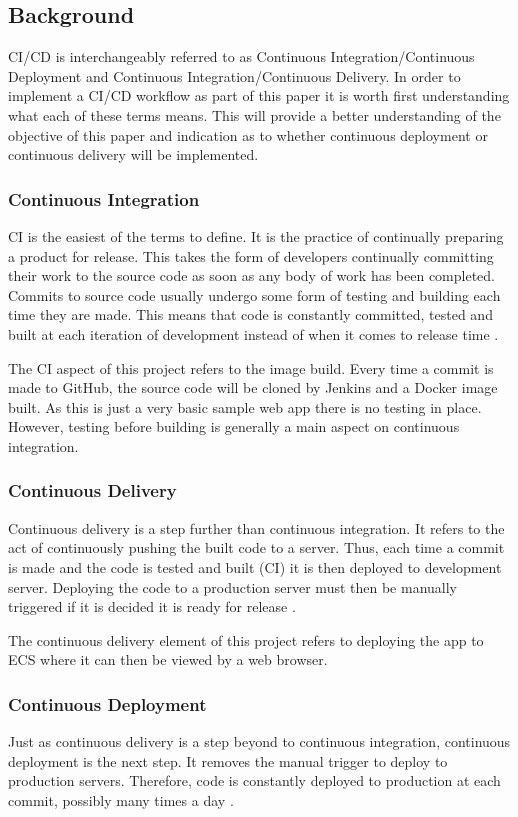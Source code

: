 	\subsection{Background}
	CI/CD is interchangeably referred to as Continuous Integration/Continuous Deployment and Continuous Integration/Continuous Delivery. In order to implement a CI/CD workflow as part of this paper it is worth first understanding what each of these terms means. This will provide a better understanding of the objective of this paper and indication as to whether continuous deployment or continuous delivery will be implemented.
	
	\subsubsection{Continuous Integration} CI is the easiest of the terms to define. It is the practice of continually preparing a product for release. This takes the form of developers continually committing their work to the source code as soon as any body of work has been completed. Commits to source code usually undergo some form of testing and building each time they are made. This means that code is constantly committed, tested and built at each iteration of development instead of when it comes to release time \citep{pittet}.
	
	The CI aspect of this project refers to the image build. Every time a commit is made to GitHub, the source code will be cloned by Jenkins and a Docker image built. As this is just a very basic sample web app there is no testing in place. However, testing before building is generally a main aspect on continuous integration.
	
	\subsubsection{Continuous Delivery} Continuous delivery is a step further than continuous integration. It refers to the act of continuously pushing the built code to a server. Thus, each time a commit is made and the code is tested and built (CI) it is then deployed to development server. Deploying the code to a production server must then be manually triggered if it is decided it is ready for release \citep{ellingwood}. 
	
	The continuous delivery element of this project refers to deploying the app to ECS where it can then be viewed by a web browser.
	
	\subsubsection{Continuous Deployment} Just as continuous delivery is a step beyond to continuous integration, continuous deployment is the next step. It removes the manual trigger to deploy to production servers. Therefore, code is constantly deployed to production at each commit, possibly many times a day \citep{ramos}.
	
